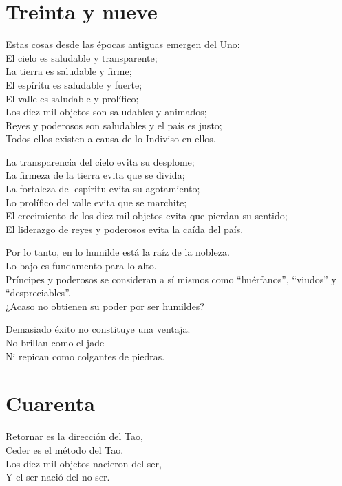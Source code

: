 \documentclass[hidelinks]{memoir}
\begin{document}
	\chapter*{Treinta y nueve}
	
	Estas cosas desde las épocas antiguas emergen del Uno:\\
	El cielo es saludable y transparente;\\
	La tierra es saludable y firme;\\
	El espíritu es saludable y fuerte;\\
	El valle es saludable y prolífico;\\
	Los diez mil objetos son saludables y animados;\\
	Reyes y poderosos son saludables y el país es justo;\\
	Todos ellos existen a causa de lo Indiviso en ellos.
	
	La transparencia del cielo evita su desplome;\\
	La firmeza de la tierra evita que se divida;\\
	La fortaleza del espíritu evita su agotamiento;\\
	Lo prolífico del valle evita que se marchite;\\
	El crecimiento de los diez mil objetos evita que pierdan su sentido;\\
	El liderazgo de reyes y poderosos evita la caída del país.
	
	Por lo tanto, en lo humilde está la raíz de la nobleza.\\
	Lo bajo es fundamento para lo alto.\\
	Príncipes y poderosos se consideran a sí mismos como ``huérfanos'',
	``viudos'' y ``despreciables''.\\
	¿Acaso no obtienen su poder por ser humildes?
	
	Demasiado éxito no constituye una ventaja.\\
	No brillan como el jade\\
	Ni repican como colgantes de piedras.
	
	\chapter*{Cuarenta}
	
	Retornar es la dirección del Tao,\\
	Ceder es el método del Tao.\\
	Los diez mil objetos nacieron del ser,\\
	Y el ser nació del no ser.
	
\end{document}
